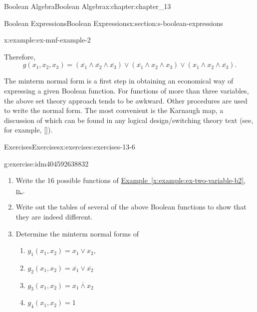 \documentclass[twoside,10pt,]{book}
\newcommand{\xreffont}{\relax}
\numberwithin{equation}{section}
\begin{document}
\begin{chapterptx}{Boolean Algebra}{}{Boolean Algebra}{}{}{x:chapter:chapter_13}
\begin{sectionptx}{Boolean Expressions}{}{Boolean Expressions}{}{}{x:section:s-boolean-expressions}
\begin{example}{}{x:example:ex-mnf-example-2}
\par
Therefore,%
\begin{equation*}
g\left(x_1, x_2, x_3\right)=\left(\overline{x_1}\land \overline{x_2}\land \overline{x_3}\right)\lor \left(\overline{x_1}\land x_2\land
x_3\right)\lor \left(x_1\land x_2\land \overline{x_3}\right).
\end{equation*}
%
\end{example}
The minterm normal form is a first step in obtaining an economical way of expressing a given Boolean function. For functions of more than three variables, the above set theory approach tends to be awkward. Other procedures are used to write the normal form. The most convenient is the Karnaugh map, a discussion of which can be found in any logical design\slash{}switching theory text (see, for example, \hyperlink{x:biblio:biblio-hill-1974}{[{\xreffont 18}]}).%
%
%
\typeout{************************************************}
\typeout{************************************************}
%
\begin{exercises-subsection}{Exercises}{}{Exercises}{}{}{x:exercises:exercises-13-6}
\begin{divisionexercise}{1}{}{}{g:exercise:idm404592638832}%
%
\begin{enumerate}[label=(\alph*)]
\item{}Write the 16 possible functions of \hyperref[x:example:ex-two-variable-b2]{Example~{\xreffont\ref{x:example:ex-two-variable-b2}}, p.\,\pageref{x:example:ex-two-variable-b2}}.%
\item{}Write out the tables of several of the above Boolean functions to show that they are indeed different.%
\item{}Determine the minterm normal forms of%
\begin{enumerate}[label=(\roman*)]
\item{}\(g_1\left(x_1, x_2\right)=x_1\lor x_2,\)%
\item{}\(g_2\left(x_1, x_2\right)=\overline{x_1}\lor \overline{x_2}\)%
\item{}\(g_3\left(x_1, x_2\right)=\overline{x_1 \land x_2}\)%
\item{}\(g_4\left(x_1, x_2\right)=1\)%
\end{enumerate}
%
\end{enumerate}
%
\end{divisionexercise}%
\end{exercises-subsection}
\end{sectionptx}
\end{chapterptx}
\end{document}

